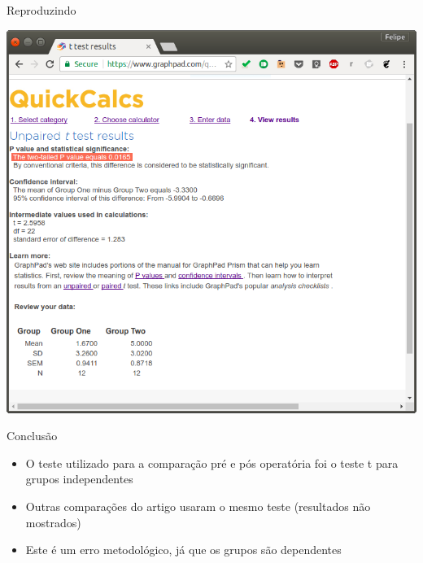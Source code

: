 \documentclass{beamer}
\begin{document}
\begin{frame}{Reproduzindo}
  \begin{center}
    \includegraphics[height=.9\textheight]{figuras/teste-t3}
  \end{center}  
\end{frame}

\begin{frame}{Conclusão}
  \begin{itemize}
  \item O teste utilizado para a comparação pré e pós operatória foi o teste t para grupos independentes
  \item Outras comparações do artigo usaram o mesmo teste (resultados não mostrados)
  \item Este é um erro metodológico, já que os grupos são dependentes
  \end{itemize}
\end{frame}
\end{document}

